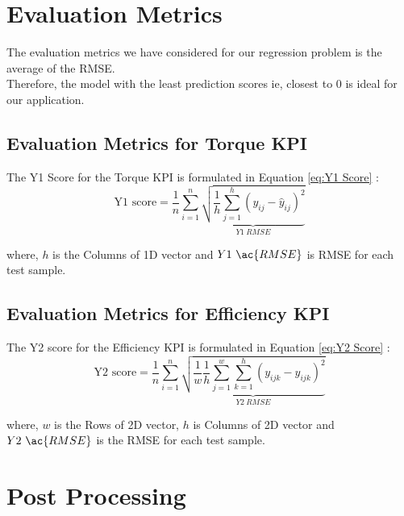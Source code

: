 \documentclass{report} %
\begin{document}
\section{Evaluation Metrics}

The evaluation metrics we have considered for our regression problem is the average of the \ac{RMSE}. \\
Therefore, the model with the least prediction scores ie, closest to 0 is ideal for our application. \\

\subsection{Evaluation Metrics for Torque \ac{KPI}}\label{sec:Evaluation Metrics for 2D KPI}

The Y1 Score for the Torque \ac{KPI} is formulated in Equation \ref{eq:Y1 Score} :
\begin{equation}
\text{Y1 score} = \frac{1}{n} \sum_{i=1}^{n} \underbrace{ \sqrt{\frac{1}{h} \sum_{j=1}^{h} (y_{ij} - \hat{y}_{ij})^2}}_{Y1\ RMSE}
\label{eq:Y1 Score}
\end{equation}

where, \(h\) is the Columns of 1D vector and \(Y1\ \ac{RMSE}\) is \ac{RMSE} for each test sample.

\subsection{Evaluation Metrics for Efficiency \ac{KPI}}\label{sec:Evaluation Metrics for 3D KPI}

The Y2 score for the Efficiency \ac{KPI} is formulated in Equation \ref{eq:Y2 Score} :
\begin{equation}
    \text{Y2 score} = \frac{1}{n} \sum_{i=1}^{n} \underbrace{ \sqrt{\frac{1}{w} \frac{1}{h} \sum_{j=1}^{w} \sum_{k=1}^{h} (y_{ijk} - \hat{y}_{ijk})^2}}_{Y2\ RMSE}
    \label{eq:Y2 Score}
\end{equation}
    
where, \(w\) is the Rows of 2\ac{D} vector, \(h\) is Columns of 2\ac{D} vector and \(Y2\ \ac{RMSE}\) is the \ac{RMSE} for each test sample.

\section{Post Processing}\label{sec:Post Processing}
\end{document}
